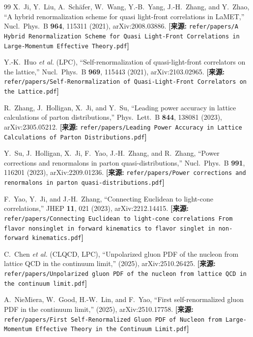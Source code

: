 \documentclass[12pt,a4paper]{ctexart}
\theoremstyle{definition}
\begin{document}
\begin{thebibliography}{99}
X.~Ji, Y.~Liu, A.~Sch\"afer, W.~Wang, Y.-B.~Yang, J.-H.~Zhang, and Y.~Zhao,
``A hybrid renormalization scheme for quasi light-front correlations in LaMET,''
Nucl.\ Phys.\ B \textbf{964}, 115311 (2021), arXiv:2008.03886.
\quad\textbf{[来源:} \texttt{refer/papers/A Hybrid Renormalization Scheme for Quasi Light-Front Correlations in Large-Momentum Effective Theory.pdf}\textbf{]}

Y.-K.~Huo \textit{et al.} (LPC),
``Self-renormalization of quasi-light-front correlators on the lattice,''
Nucl.\ Phys.\ B \textbf{969}, 115443 (2021), arXiv:2103.02965.
\quad\textbf{[来源:} \texttt{refer/papers/Self-Renormalization of Quasi-Light-Front Correlators on the Lattice.pdf}\textbf{]}

R.~Zhang, J.~Holligan, X.~Ji, and Y.~Su,
``Leading power accuracy in lattice calculations of parton distributions,''
Phys.\ Lett.\ B \textbf{844}, 138081 (2023), arXiv:2305.05212.
\quad\textbf{[来源:} \texttt{refer/papers/Leading Power Accuracy in Lattice Calculations of Parton Distributions.pdf}\textbf{]}

Y.~Su, J.~Holligan, X.~Ji, F.~Yao, J.-H.~Zhang, and R.~Zhang,
``Power corrections and renormalons in parton quasi-distributions,''
Nucl.\ Phys.\ B \textbf{991}, 116201 (2023), arXiv:2209.01236.
\quad\textbf{[来源:} \texttt{refer/papers/Power corrections and renormalons in parton quasi-distributions.pdf}\textbf{]}

F.~Yao, Y.~Ji, and J.-H.~Zhang,
``Connecting Euclidean to light-cone correlations,''
JHEP \textbf{11}, 021 (2023), arXiv:2212.14415.
\quad\textbf{[来源:} \texttt{refer/papers/Connecting Euclidean to light-cone correlations From flavor nonsinglet in forward kinematics to flavor singlet in non-forward kinematics.pdf}\textbf{]}

C.~Chen \textit{et al.} (CLQCD, LPC),
``Unpolarized gluon PDF of the nucleon from lattice QCD in the continuum limit,''
(2025), arXiv:2510.26425.
\quad\textbf{[来源:} \texttt{refer/papers/Unpolarized gluon PDF of the nucleon from lattice QCD in the continuum limit.pdf}\textbf{]}

A.~NieMiera, W.~Good, H.-W.~Lin, and F.~Yao,
``First self-renormalized gluon PDF in the continuum limit,''
(2025), arXiv:2510.17758.
\quad\textbf{[来源:} \texttt{refer/papers/First Self-Renormalized Gluon PDF of Nucleon from Large-Momentum Effective Theory in the Continuum Limit.pdf}\textbf{]}


\end{thebibliography}
\end{document}
